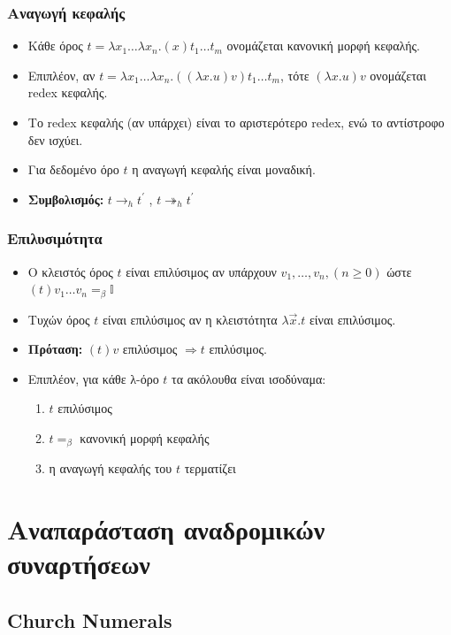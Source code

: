 \documentclass{beamer}
\begin{document}
\begin{frame}
\frametitle{Αναγωγή κεφαλής}
\begin{itemize}
\item Κάθε όρος $t = \lambda x_1 \ldots \lambda x_n . (x) t_1 \ldots t_m$ ονομάζεται κανονική μορφή κεφαλής.\pause
\item Επιπλέον, αν $t = \lambda x_1 \ldots \lambda x_n . ((\lambda x . u) v) t_1 \ldots t_m$, τότε $(\lambda x . u) v$ ονομάζεται redex κεφαλής.\pause
\item Το redex κεφαλής (αν υπάρχει) είναι το αριστερότερο redex, ενώ το αντίστροφο δεν ισχύει.\pause
\item Για δεδομένο όρο $t$ η αναγωγή κεφαλής είναι μοναδική.
\item \textbf{Συμβολισμός:} $t \rightarrow _h t^\prime$ , $t \twoheadrightarrow _h t^\prime$ \pause
\end{itemize}
\end{frame}

\begin{frame}
\frametitle{Επιλυσιμότητα}
\begin{itemize}
\item Ο κλειστός όρος $t$ είναι επιλύσιμος αν υπάρχουν $v_1, \ldots, v_n, (n \geqslant 0)$ ώστε
 $ (t) v_1 \ldots v_n =_\beta \mathbb{I} $ \pause
 \item Τυχών όρος $t$ είναι επιλύσιμος αν η κλειστότητα $\lambda \overrightarrow{x} . t$ είναι επιλύσιμος. \pause
 \item \textbf{Πρόταση:} $(t) v$ επιλύσιμος $ \Rightarrow t$ επιλύσιμος. \pause
 \item Επιπλέον, για κάθε λ-όρο $t$ τα ακόλουθα είναι ισοδύναμα:
 	\begin{enumerate}
 	\item $t$ επιλύσιμος
 	\item $t =_\beta$ κανονική μορφή κεφαλής
 	\item η αναγωγή κεφαλής του $t$ τερματίζει 	
 	\end{enumerate}
\end{itemize}
\end{frame}

\section{Αναπαράσταση αναδρομικών συναρτήσεων}

\subsection{Church Numerals}
\end{document}
